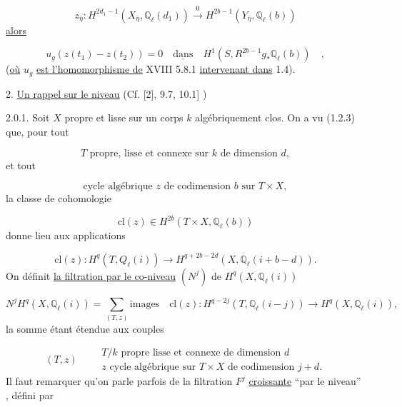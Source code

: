 \begin{equation}\tag{1.7.2}
z_{\overline{\eta}} : H^{2d_1-1} (X_{\overline{\eta}}, \mathbb{Q}_\ell(d_1)) \stackrel{0}{\longrightarrow} H^{2b-1}(Y_{\overline{\eta}}, \mathbb{Q}_\ell(b))
\end{equation}
\underline{alors}

\begin{equation}\tag{1.7.3}
u_g(z(t_1) - z(t_2)) = 0 \quad \underline{\mbox{dans}} \quad H^1(S, R^{2b-1}g_* \mathbb{Q}_\ell(b)) \quad ,
\end{equation}
(\underline{où} $u_g$ \underline{est l'homomorphisme de} XVIII 5.8.1 \underline{intervenant dans} 1.4).




2.  \underline{Un rappel sur le niveau} (Cf. [2], 9.7, 10.1] )

2.0.1. Soit  $X$  propre et lisse sur un corps  $k$  algébriquement clos. On a vu (1.2.3) que, pour tout

\begin{equation}\tag{2.0.2}
T \text{ propre, lisse et connexe sur } k \text{ de dimension } d ,
\end{equation}
et tout

\begin{equation}\tag{2.0.3}
\text{cycle algébrique } z \text{ de codimension } b \text{ sur } T \times X,
\end{equation}
la classe de cohomologie

\begin{equation}\tag{2.0.4}
\mathrm{cl}(z) \in H^{2b}(T \times X , \mathbb{Q}_\ell(b))
\end{equation}
donne lieu aux applications

\begin{equation}\tag{2.0.5}
\mathrm{cl}(z) : H^q(T, Q_\ell(i)) \longrightarrow H^{q+2b-2d} (X, \mathbb{Q}_\ell(i+b-d)) .
\end{equation}
On définit \underline{la filtration par le co-niveau}  $(N^j)$  de  $H^q(X,\mathbb{Q}_\ell(i))$

\begin{equation}\tag{2.0.6}
N^j H^q(X,\mathbb{Q}_\ell(i)) = \sum_{(T,z)} \text{images} \quad \mathrm{cl}(z) : H^{q-2j}(T,\mathbb{Q}_\ell(i-j)) \longrightarrow H^q(X,\mathbb{Q}_\ell(i)),
\end{equation}
la somme étant étendue aux couples

\begin{equation}\tag{2.0.7}
(T, z) \qquad \begin{array}{l} T/k \text{ propre lisse et connexe de dimension } d \\ z \text{ cycle algébrique sur } T \times X \text{ de codimension } j+d. \end{array}
\end{equation}
Il faut remarquer qu'on parle parfois de la filtration  $F^j$  \underline{croissante} ``par le niveau''  , défini par

